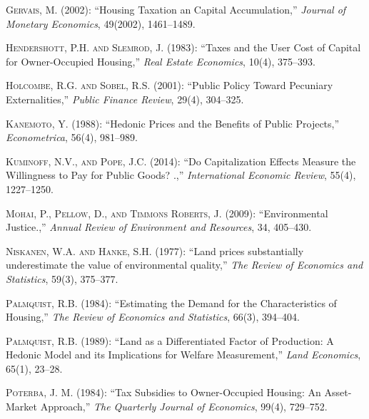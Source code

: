 \documentclass[ecta,nameyear,draft]{econsocart}
\theoremstyle{plain}
\theoremstyle{remark}
\begin{document}
\begin{thebibliography}{}
\textsc{Gervais, M.} (2002):
``Housing Taxation an Capital Accumulation,''
\textit{Journal of Monetary Economics}, 49(2002), 1461--1489.
\endbibitem

\textsc{Hendershott, P.H. and Slemrod, J.} (1983):
``Taxes and the User Cost of Capital for Owner-Occupied Housing,''
\textit{Real Estate Economics}, 10(4), 375--393.
\endbibitem

\textsc{Holcombe, R.G. and Sobel, R.S.} (2001):
``Public Policy Toward Pecuniary Externalities,''
\textit{Public Finance Review}, 29(4), 304--325.
\endbibitem

\textsc{Kanemoto, Y.} (1988):
``Hedonic Prices and the Benefits of Public Projects,''
\textit{Econometrica}, 56(4), 981--989.
\endbibitem

\textsc{Kuminoff, N.V., and Pope, J.C.} (2014):
``Do Capitalization Effects Measure the Willingness to Pay for Public Goods?  .,''
\textit{International Economic Review}, 55(4), 1227--1250.
\endbibitem

\textsc{Mohai, P., Pellow, D., and Timmons Roberts, J.} (2009):
``Environmental Justice.,''
\textit{Annual Review of Environment and Resources}, 34, 405--430.
\endbibitem

\textsc{Niskanen, W.A. and Hanke, S.H.} (1977):
``Land prices substantially underestimate the value of environmental quality,''
\textit{The Review of Economics and Statistics}, 59(3), 375--377.
\endbibitem

\textsc{Palmquist, R.B.} (1984):
``Estimating the Demand for the Characteristics of Housing,''
\textit{The Review of Economics and Statistics}, 66(3), 394--404.
\endbibitem


\textsc{Palmquist, R.B.} (1989):
``Land as a Differentiated Factor of Production: A Hedonic Model and its Implications for Welfare Measurement,''
\textit{Land Economics}, 65(1), 23--28.
\endbibitem

\textsc{Poterba, J. M.} (1984):
``Tax Subsidies to Owner-Occupied Housing: An Asset-Market Approach,''
\textit{The Quarterly Journal of Economics}, 99(4), 729--752.
\endbibitem


\end{thebibliography}
\end{document}
